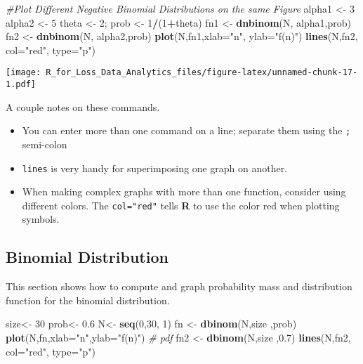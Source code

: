 \documentclass[]{book}
\newenvironment{Shaded}{\begin{snugshade}}{\end{snugshade}}
\newcommand{\KeywordTok}[1]{\textcolor[rgb]{0.13,0.29,0.53}{\textbf{#1}}}
\newcommand{\DataTypeTok}[1]{\textcolor[rgb]{0.13,0.29,0.53}{#1}}
\newcommand{\DecValTok}[1]{\textcolor[rgb]{0.00,0.00,0.81}{#1}}
\newcommand{\FloatTok}[1]{\textcolor[rgb]{0.00,0.00,0.81}{#1}}
\newcommand{\StringTok}[1]{\textcolor[rgb]{0.31,0.60,0.02}{#1}}
\newcommand{\CommentTok}[1]{\textcolor[rgb]{0.56,0.35,0.01}{\textit{#1}}}
\newcommand{\OperatorTok}[1]{\textcolor[rgb]{0.81,0.36,0.00}{\textbf{#1}}}
\newcommand{\NormalTok}[1]{#1}
\providecommand{\tightlist}{%
  \setlength{\itemsep}{0pt}\setlength{\parskip}{0pt}}
\theoremstyle{definition}
\theoremstyle{definition}
\theoremstyle{definition}
\theoremstyle{remark}
\begin{document}
\begin{Shaded}
\begin{Highlighting}[]
\CommentTok{#Plot Different Negative Binomial Distributions on the same Figure}
\NormalTok{alpha1 <-}\StringTok{ }\DecValTok{3}
\NormalTok{alpha2 <-}\StringTok{ }\DecValTok{5}
\NormalTok{theta <-}\StringTok{ }\DecValTok{2}\NormalTok{; prob <-}\StringTok{ }\DecValTok{1}\OperatorTok{/}\NormalTok{(}\DecValTok{1}\OperatorTok{+}\NormalTok{theta)}
\NormalTok{fn1 <-}\StringTok{ }\KeywordTok{dnbinom}\NormalTok{(N, alpha1,prob)}
\NormalTok{fn2 <-}\StringTok{ }\KeywordTok{dnbinom}\NormalTok{(N, alpha2,prob)}
\KeywordTok{plot}\NormalTok{(N,fn1,}\DataTypeTok{xlab=}\StringTok{"n"}\NormalTok{, }\DataTypeTok{ylab=}\StringTok{"f(n)"}\NormalTok{)}
\KeywordTok{lines}\NormalTok{(N,fn2, }\DataTypeTok{col=}\StringTok{"red"}\NormalTok{, }\DataTypeTok{type=}\StringTok{"p"}\NormalTok{)}
\end{Highlighting}
\end{Shaded}

\texttt{[image: R\_for\_Loss\_Data\_Analytics\_files/figure-latex/unnamed-chunk-17-1.pdf]}

A couple notes on these commands.

\begin{itemize}
\tightlist
\item
  You can enter more than one command on a line; separate them using the
  \texttt{;} semi-colon
\item
  \texttt{lines} is very handy for superimposing one graph on another.
\item
  When making complex graphs with more than one function, consider using
  different colors. The \texttt{col="red"} tells \textbf{R} to use the
  color red when plotting symbols.
\end{itemize}

\subsection{Binomial Distribution}\label{binomial-distribution}

This section shows how to compute and graph probability mass and
distribution function for the binomial distribution.

\begin{Shaded}
\begin{Highlighting}[]
\NormalTok{size<-}\StringTok{ }\DecValTok{30}
\NormalTok{prob<-}\StringTok{ }\FloatTok{0.6}
\NormalTok{N<-}\StringTok{ }\KeywordTok{seq}\NormalTok{(}\DecValTok{0}\NormalTok{,}\DecValTok{30}\NormalTok{, }\DecValTok{1}\NormalTok{)}
\NormalTok{fn <-}\StringTok{ }\KeywordTok{dbinom}\NormalTok{(N,size ,prob)}
\KeywordTok{plot}\NormalTok{(N,fn,}\DataTypeTok{xlab=}\StringTok{"n"}\NormalTok{,}\DataTypeTok{ylab=}\StringTok{"f(n)"}\NormalTok{) }\CommentTok{# pdf}
\NormalTok{fn2 <-}\StringTok{ }\KeywordTok{dbinom}\NormalTok{(N,size ,}\FloatTok{0.7}\NormalTok{)}
\KeywordTok{lines}\NormalTok{(N,fn2, }\DataTypeTok{col=}\StringTok{"red"}\NormalTok{, }\DataTypeTok{type=}\StringTok{"p"}\NormalTok{)}
\end{Highlighting}
\end{Shaded}
\end{document}
